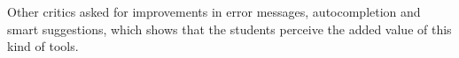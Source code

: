 Other critics asked for improvements in error messages, autocompletion and smart suggestions, 
which shows that the students perceive the added value of this kind of tools.

